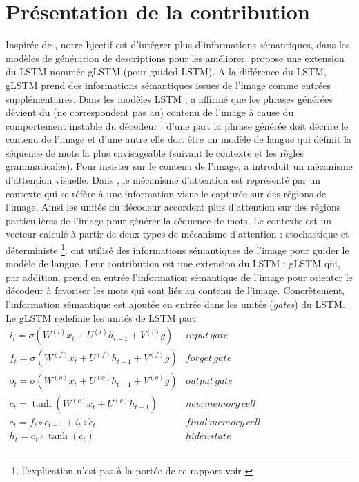 \section{Présentation de la contribution} \label{presentationcontrib}
\qquad Inspirée de \cite{jia2015guiding} \cite{xu2015show}, notre bjectif est d'intégrer plus d'informations sémantiques, dans les modèles de génération de descriptions pour les améliorer. \cite{jia2015guiding} propose une extension du LSTM nommée gLSTM (pour guided LSTM). A la différence du LSTM, gLSTM prend  des informations sémantiques issues de l'image comme entrées supplémentaires. Dans les modèles LSTM \cite{mao2014deep} \cite{vinyals2015show} \cite{donahue2015long}; \cite{jia2015guiding} a affirmé que  les phrases générées dévient du (ne correspondent pas au) contenu de l'image à cause du comportement instable du décodeur : d'une part la phrase générée doit décrire le contenu de l'image  et d'une autre elle doit être un modèle de langue qui définit la séquence de mots la plus envisageable (suivant le contexte et les règles grammaticales). Pour insister sur le contenu de l'image, \cite{xu2015show} a introduit un mécanisme d'attention visuelle.
Dans \cite{xu2015show}, le mécanisme d'attention est représenté par un contexte qui se réfère à une information visuelle capturée sur des régions de l'image. Ainsi les unités du décodeur accordent plus d'attention sur des régions particulières de l'image pour générer la séquence de mots.
Le contexte est un vecteur calculé à partir de deux types de mécanisme d'attention : stochastique et déterministe \footnote{l'explication n'est pas à la portée de ce rapport voir \cite{xu2015show}}. \cite{jia2015guiding} ont utilisé des informations sémantiques de l'image pour guider le modèle de langue. Leur contribution est une extension du LSTM : gLSTM qui, par addition, prend en entrée l'information sémantique de l'image  pour orienter le décodeur à favoriser les mots qui sont liés au contenu de l'image. Concrètement, l'information sémantique est ajoutée en entrée dans les unités (\textit{gates}) du LSTM.\\
Le gLSTM redefinie les unités de LSTM par:\\
$\begin{matrix}
i_{t}=\sigma(W^{(i)}x_{t}+ U^{(i)}h_{t-1} + V^{(i)}g) & input\, gate\\ 
f_{t}=\sigma(W^{(f)}x_{t}+ U^{(f)}h_{t-1} + V^{(f)}g )& forget\, gate\\
o_{t}=\sigma(W^{(o)}x_{t}+ U^{(o)}h_{t-1} + V^{(o)}g)  & output\, gate\\ 
\check{c}_{t} = \tanh(W^{(c)}x_{t}+ U^{(c)}h_{t-1}) & new\, memory\, cell\\
c_{t}=f_{t} \circ c_{t-1}+i_{t} \circ \check{c}_{t} & final\, memory\, cell\\
h_{t}=o_{t} \circ \tanh(c_{t})& hiden state 
\end{matrix}$

